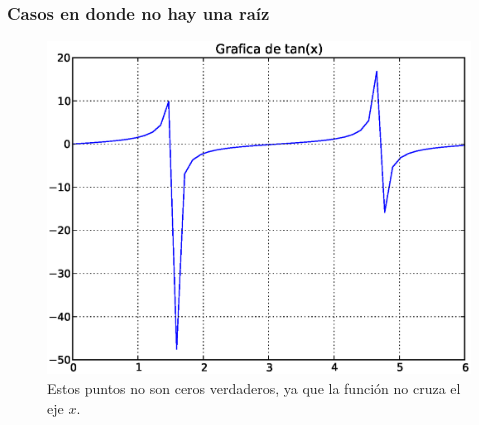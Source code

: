 \begin{frame}
\frametitle{Casos en donde no hay una raíz}
\begin{figure}
	\centering
	\includegraphics[scale=0.4]{Imagenes/raices05.eps}
	\caption{Estos puntos no son ceros verdaderos, ya que la función no cruza el eje $x$.}
\end{figure}
\end{frame}
